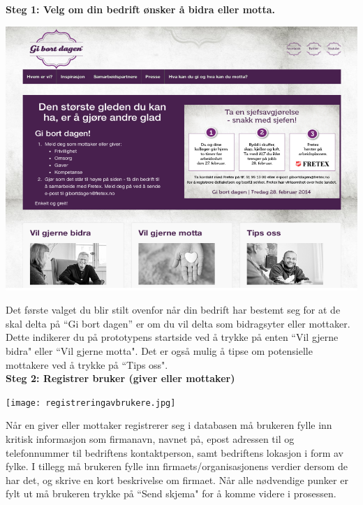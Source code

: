 \bf{Steg 1:} Velg om din bedrift ønsker å bidra eller motta.
\begin{center}
\includegraphics[clip=true, width=1 \textwidth,
trim=0cm 0cm 0cm 0cm]{startside.png}
\label{fig:startside}
\end{center}

Det første valget du blir stilt ovenfor når din bedrift har bestemt seg for at de skal delta på “Gi bort dagen” er om du vil delta som bidragsyter eller mottaker. Dette indikerer du på prototypens startside ved å trykke på enten ``Vil gjerne bidra" eller ``Vil gjerne motta". Det er også mulig å tipse om potensielle mottakere ved å trykke på ``Tips oss".\\

\bf{Steg 2:} Registrer bruker (giver eller mottaker)
\begin{center}
\texttt{[image: registreringavbrukere.jpg]}
\label{fig:registrering}
\end{center}

Når en giver eller mottaker registrerer seg i databasen må brukeren fylle inn kritisk informasjon som firmanavn, navnet på, epost adressen til og telefonnummer til bedriftens kontaktperson, samt bedriftens lokasjon i form av fylke. I tillegg må brukeren fylle inn firmaets/organisasjonens verdier dersom de har det, og skrive en kort beskrivelse om firmaet. Når alle nødvendige punker er fylt ut må brukeren trykke på ``Send skjema" for å komme videre i prosessen.\\

